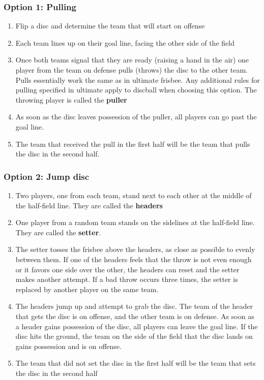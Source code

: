 \documentclass[10pt]{article}
\begin{document}
        \subsubsection{Option 1: Pulling}
            \begin{enumerate}
                \item Flip a disc and determine the team that will start on offense
                \item Each team lines up on their goal line, facing the other side of the field
                \item Once both teams signal that they are ready (raising a hand in the air) one player from the team on defense pulls (throws) the disc to the other team. Pulls essentially work the same as in ultimate frisbee. Any additional rules for pulling specified in ultimate apply to discball when choosing this option. The throwing player is called the \textbf{puller}
                \item As soon as the disc leaves possession of the puller, all players can go past the goal line.
                \item The team that received the pull in the first half will be the team that pulls the disc in the second half.
            \end{enumerate}

        \subsubsection{Option 2: Jump disc}
            \begin{enumerate}
                \item Two players, one from each team, stand next to each other at the middle of the half-field line. They are called the \textbf{headers}
                \item One player from a random team stands on the sidelines at the half-field line. They are called the \textbf{setter}.
                \item The setter tosses the frisbee above the headers, as close as possible to evenly between them. If one of the headers feels that the throw is not even enough or it favors one side over the other, the headers can reset and the setter makes another attempt. If a bad throw occurs three times, the setter is replaced by another player on the same team.
                \item The headers jump up and attempt to grab the disc. The team of the header that gets the disc is on offense, and the other team is on defense. As soon as a header gains possession of the disc, all players can leave the goal line. If the disc hits the ground, the team on the side of the field that the disc lands on gains possession and is on offense.
                \item The team that did not set the disc in the first half will be the team that sets the disc in the second half
            \end{enumerate}
\end{document}

